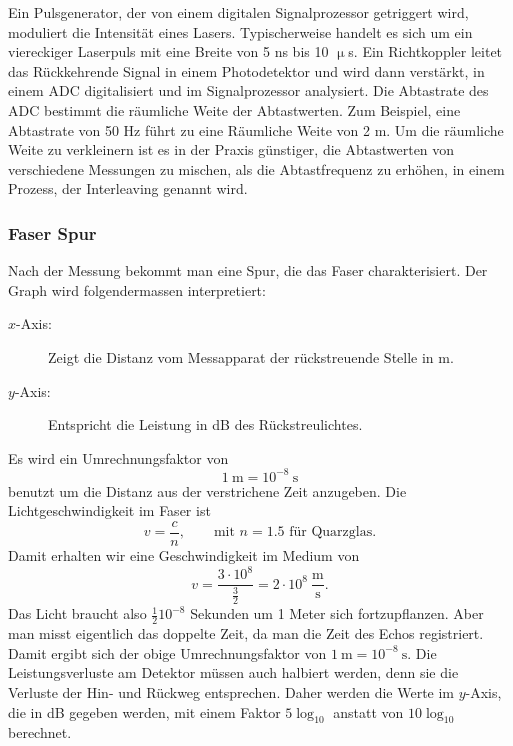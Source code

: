 \documentclass[a4paper]{article}
\begin{document}
Ein Pulsgenerator, der von einem digitalen Signalprozessor getriggert wird,
moduliert die Intensität eines Lasers. Typischerweise handelt es sich um ein
viereckiger Laserpuls mit eine Breite von 5 ns bis 10 $\upmu$s. Ein
Richtkoppler leitet das Rückkehrende Signal in einem Photodetektor und wird
dann verstärkt, in einem ADC digitalisiert und im Signalprozessor analysiert.
Die Abtastrate des ADC bestimmt die räumliche Weite der Abtastwerten. Zum
Beispiel, eine Abtastrate von 50 Hz führt zu eine Räumliche Weite von 2 m. Um
die räumliche Weite zu verkleinern ist es in der Praxis günstiger, die
Abtastwerten von verschiedene Messungen zu mischen, als die Abtastfrequenz zu
erhöhen, in einem Prozess, der Interleaving genannt wird.

\subsubsection{Faser Spur}
Nach der Messung bekommt man eine Spur, die das Faser charakterisiert. Der
Graph wird folgendermassen interpretiert:
\begin{description}
  \item[$x$-Axis:] Zeigt die Distanz vom Messapparat der rückstreuende Stelle
    in m.
  \item[$y$-Axis:] Entspricht die Leistung in dB des Rückstreulichtes.
\end{description}
Es wird ein Umrechnungsfaktor von 
\begin{equation*}
1 \ \mathrm m = 10^{-8} \ \mathrm s 
\end{equation*}
benutzt um die Distanz aus der verstrichene Zeit anzugeben. Die
Lichtgeschwindigkeit im Faser ist
\begin{equation*}
  v = \frac{c}{n}, \quad\quad \text{mit } n = 1.5 \text{ für Quarzglas.}
\end{equation*}
Damit erhalten wir eine Geschwindigkeit im Medium von 
\begin{equation*}
  v = \frac{3 \cdot 10^{8}}{\frac{3}{2}} = 2 \cdot 10^{8}
  \ \frac{\mathrm m}{\mathrm s}.
\end{equation*} Das Licht braucht also $\frac{1}{2} 10^{-8}$ Sekunden um 1
Meter sich fortzupflanzen. Aber man misst eigentlich das doppelte Zeit, da man
die Zeit des Echos registriert. Damit ergibt sich der obige Umrechnungsfaktor
von $1\ \mathrm m = 10^{-8} \ \mathrm s$. Die Leistungsverluste am Detektor
müssen auch halbiert werden, denn sie die Verluste der Hin- und Rückweg
entsprechen. Daher werden die Werte im $y$-Axis, die in dB gegeben werden, mit
einem Faktor $5\log_{10}$ anstatt von $10\log_{10}$ berechnet.
\end{document}
